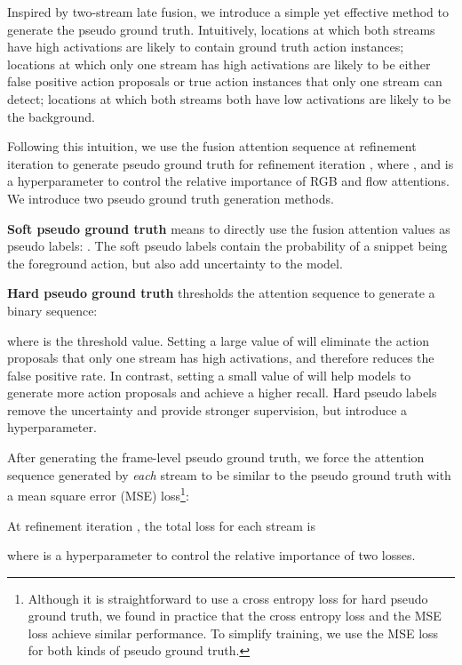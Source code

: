 \documentclass[runningheads]{llncs}
\begin{document}
Inspired by two-stream late fusion, we introduce a simple yet effective method to generate the pseudo ground truth. Intuitively, locations at which both streams have high activations are likely to contain ground truth action instances; locations at which only one stream has high activations are likely to be either false positive action proposals or true action instances that only one stream can detect; locations at which both streams both have low activations are likely to be the background.

Following this intuition, we use the fusion attention sequence  at refinement iteration  to generate pseudo ground truth  for refinement iteration , where , and  is a hyperparameter to control the relative importance of RGB and flow attentions.
We introduce two pseudo ground truth generation methods.

\noindent\textbf{Soft pseudo ground truth} means to directly use the fusion attention values as pseudo labels: . The soft pseudo labels contain the probability of a snippet being the foreground action, but also add uncertainty to the model.

\noindent\textbf{Hard pseudo ground truth} thresholds the attention sequence to generate a binary sequence:

where  is the threshold value. Setting a large value of  will eliminate the action proposals that only one stream has high activations, and therefore reduces the false positive rate. In contrast, setting a small value of  will help models to generate more action proposals and achieve a higher recall. Hard pseudo labels remove the uncertainty and provide stronger supervision, but introduce a hyperparameter.

After generating the frame-level pseudo  ground truth, we force the attention sequence generated by \textit{each} stream to be similar to the pseudo ground truth with a mean square error (MSE) loss\footnote{Although it is straightforward to use a cross entropy loss for hard pseudo ground truth, we found in practice that the cross entropy loss and the MSE loss achieve similar performance. To simplify training, we use the MSE loss for both kinds of pseudo ground truth.}:

At refinement iteration , the total loss for each stream is 

where  is a hyperparameter to control the relative importance of two losses.
\end{document}
